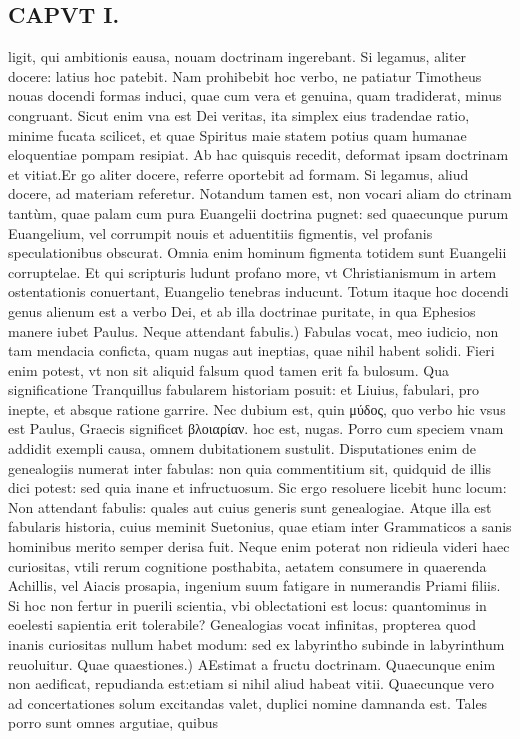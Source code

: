 \documentclass{article}
\begin{document}
\begin{pages}
\section*{CAPVT I. }
\marginpar{[ p.3 ]}\pstart ligit, qui ambitionis eausa, nouam doctrinam ingerebant. Si legamus, aliter docere: latius hoc patebit. Nam prohibebit hoc verbo, ne patiatur Timotheus nouas docendi formas induci, quae cum vera et genuina, quam tradiderat, minus congruant. Sicut enim vna est Dei veritas, ita simplex eius tradendae ratio, minime fucata scilicet, et quae Spiritus maie statem potius quam humanae eloquentiae pompam resipiat. Ab hac quisquis recedit, deformat ipsam doctrinam et vitiat.Er go aliter docere, referre oportebit ad formam. Si legamus, aliud docere, ad materiam referetur. Notandum tamen est, non vocari aliam do ctrinam tantùm, quae palam cum pura Euangelii doctrina pugnet: sed quaecunque purum Euangelium, vel corrumpit nouis et aduentitiis figmentis, vel profanis speculationibus obscurat. Omnia enim hominum figmenta totidem sunt Euangelii corruptelae. Et qui scripturis ludunt profano more, vt Christianismum in artem ostentationis conuertant, Euangelio tenebras inducunt. Totum itaque hoc docendi genus alienum est a verbo Dei, et ab illa doctrinae puritate, in qua Ephesios manere iubet Paulus.  \pend\pstart Neque attendant fabulis.) Fabulas vocat, meo iudicio, non tam mendacia conficta, quam nugas aut ineptias, quae nihil habent solidi. Fieri enim potest, vt non sit aliquid falsum quod tamen erit fa bulosum. Qua significatione Tranquillus fabularem historiam posuit: et Liuius, fabulari, pro inepte, et absque ratione garrire. Nec dubium est, quin μύδος, quo verbo hic vsus est Paulus, Graecis significet βλοιαρίαν. hoc est, nugas. Porro cum speciem vnam addidit exempli causa, omnem dubitationem sustulit. Disputationes enim de genealogiis numerat inter fabulas: non quia commentitium sit, quidquid de illis dici potest: sed quia inane et infructuosum. Sic ergo resoluere licebit hunc locum: Non attendant fabulis: quales aut cuius generis sunt genealogiae. Atque illa est fabularis historia, cuius meminit Suetonius, quae etiam inter Grammaticos a sanis hominibus merito semper derisa fuit. Neque enim poterat non ridieula videri haec curiositas, vtili rerum cognitione posthabita, aetatem consumere in quaerenda Achillis, vel Aiacis prosapia, ingenium suum fatigare in numerandis Priami filiis. Si hoc non fertur in puerili scientia, vbi oblectationi est locus: quantominus in eoelesti sapientia erit tolerabile? Genealogias vocat infinitas, propterea quod inanis curiositas nullum habet modum: sed ex labyrintho subinde in labyrinthum reuoluitur.  \pend\pstart Quae quaestiones.) AEstimat a fructu doctrinam. Quaecunque enim non aedificat, repudianda est:etiam si nihil aliud habeat vitii. Quaecunque vero ad concertationes solum excitandas valet, duplici nomine damnanda est. Tales porro sunt omnes argutiae, quibus  \pend

\end{pages}
\end{document}
